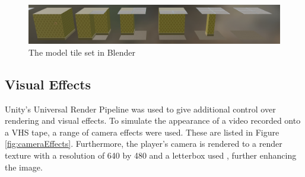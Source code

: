 \begin{figure}[H]
    \centering
    \includegraphics[width=\textwidth, height=0.3\textheight, keepaspectratio]{Images/Tileset.jpg}
    \caption{The model tile set in Blender}
    \label{fig:blenderTileSet}
\end{figure}

\subsection{Visual Effects}
Unity's Universal Render Pipeline was used to give additional control over rendering and visual effects. To simulate the appearance of a video recorded onto a VHS tape, a range of camera effects were used. These are listed in Figure \ref{fig:cameraEffects}. Furthermore, the player's camera is rendered to a render texture with a resolution of 640 by 480 \cite{vhsGraphicsGuide} and a letterbox used \cite{letterboxer_github}, further enhancing the image.


